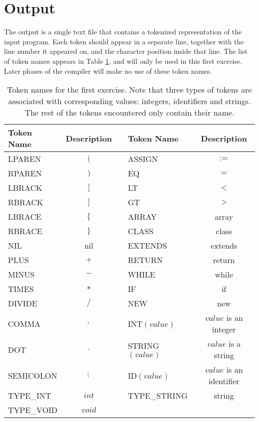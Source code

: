 \documentclass{article}
\begin{document}
\section{Output}
The output is a single text file that contains a tokenized representation of the input program.
Each token should appear in a separate line, together with the line number
it appeared on, and the character position inside that line.
The list of token names appears in Table \ref{Table_Token_Names_For_Exercise_1},
and will only be used in this first exercise.
Later phases of the compiler will make no use of these token names.
\begin{table}[h]
\centering
\begin{tabular}{|l|c|c|l|c|}
\hline
Token Name & Description & & Token Name & Description \\
\hline
\hline
LPAREN    & $($  & & ASSIGN           & $:=$                     \\
RPAREN    & $)$  & & EQ               & $=$                      \\
LBRACK    & $[$  & & LT               & $<$                      \\
RBRACK    & $]$  & & GT               & $>$                      \\
LBRACE    & $\{$ & & ARRAY            & array                    \\
RBRACE    & $\}$ & & CLASS            & class                    \\
NIL       & nil  & & EXTENDS          & extends                  \\
PLUS      & $+$  & & RETURN           & return                   \\
MINUS     & $-$  & & WHILE            & while                    \\
TIMES     & $*$  & & IF               & if                       \\
DIVIDE    & $/$  & & NEW              & new                      \\
COMMA     & $,$  & & INT$(value)$     & $value$ is an integer    \\
DOT       & $.$  & & STRING$(value)$  & $value$ is a string      \\
SEMICOLON & $;$  & & ID$(value)$      & $value$ is an identifier \\
TYPE\_INT & $int$  & & TYPE\_STRING   & string \\
TYPE\_VOID & $void$  & & \\
\hline
\end{tabular}
\caption{
Token names for the first exercise.
Note that three types of tokens are associated with corresponding values:
integers, identifiers and strings.
The rest of the tokens encountered only contain their name.
\label{Table_Token_Names_For_Exercise_1}}
\end{table}
\end{document}
